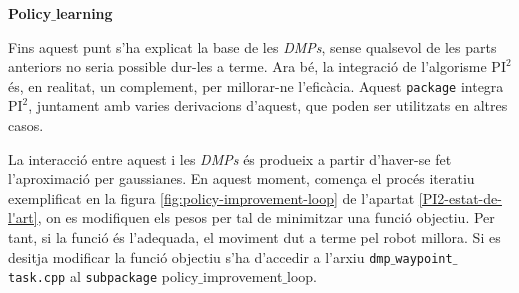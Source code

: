 \documentclass[12pt,a4paper,final,twoside]{article}
\begin{document}
\vspace{20pt}
\textbf{Policy$\_$learning}

Fins aquest punt s'ha explicat la base de les \textit{DMPs}, sense qualsevol de les parts anteriors no seria possible dur-les a terme. Ara bé, la integració de l'algorisme $\mathrm{PI^2}$ és, en realitat, un complement, per millorar-ne l'eficàcia. Aquest \texttt{package} integra $\mathrm{PI^2}$, juntament amb varies derivacions d'aquest, que poden ser utilitzats en altres casos.

La interacció entre aquest i les \textit{DMPs} és produeix a partir d'haver-se fet l'aproximació per gaussianes. En aquest moment, comença el procés iteratiu exemplificat en la figura \ref{fig:policy-improvement-loop} de l'apartat \ref{PI2-estat-de-l'art}, on es modifiquen els pesos per tal de minimitzar una funció objectiu. Per tant, si la funció és l'adequada, el moviment dut a terme pel robot millora. Si es desitja modificar la funció objectiu s'ha d'accedir a l'arxiu \texttt{dmp$\_$waypoint$\_$task.cpp} al \texttt{subpackage} policy$\_$improvement$\_$loop.






\end{document}
